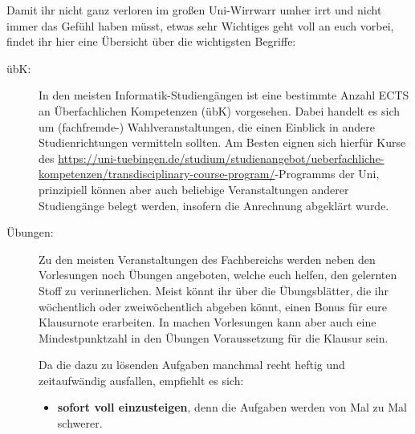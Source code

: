 Damit ihr nicht ganz verloren im gro\ss en Uni-Wirrwarr umher irrt und
  nicht immer das Gefühl haben müsst, etwas sehr Wichtiges geht
  voll an euch vorbei, findet ihr hier eine Übersicht über die wichtigsten Begriffe:

\begin{description}



  
\item [übK:] In den meisten Informatik-Studiengängen ist eine bestimmte Anzahl ECTS an Überfachlichen Kompetenzen (übK) vorgesehen. Dabei handelt es sich um (fachfremde-) Wahlveranstaltungen, die einen Einblick in andere Studienrichtungen vermitteln sollten. Am Besten eignen sich hierfür Kurse des \href{TRACS}{https://uni-tuebingen.de/studium/studienangebot/ueberfachliche-kompetenzen/transdisciplinary-course-program/}-Programms der Uni, prinzipiell können aber auch beliebige Veranstaltungen anderer Studiengänge belegt werden, insofern die Anrechnung abgeklärt wurde.

\item [Übungen:] Zu den meisten Veranstaltungen des Fachbereichs werden neben den Vorlesungen noch Übungen angeboten, welche euch helfen, den gelernten Stoff zu verinnerlichen. Meist könnt ihr über die Übungsblätter, die ihr wöchentlich oder zweiwöchentlich abgeben könnt, einen Bonus für eure Klausurnote erarbeiten. In machen Vorlesungen kann aber auch eine Mindestpunktzahl in den Übungen Voraussetzung für die Klausur sein.

Da die dazu zu lösenden Aufgaben manchmal recht heftig und zeitaufwändig ausfallen, empfiehlt es sich:

\begin{itemize}

\item \textbf{sofort voll einzusteigen}, denn die Aufgaben werden von Mal
  zu Mal schwerer.


\end{itemize}
\end{description}
